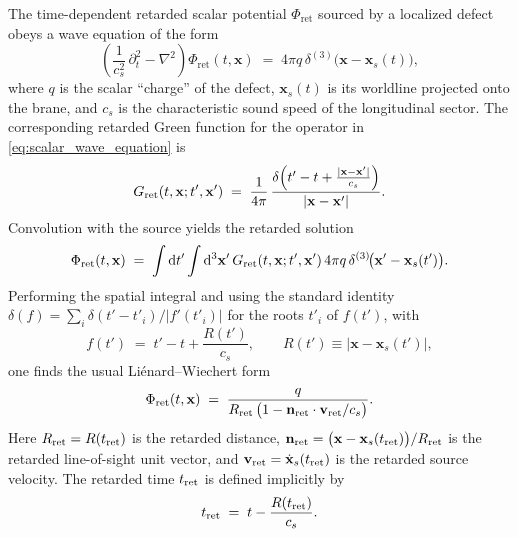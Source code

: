 \documentclass[11pt]{article}
\newcommand{\cS}{c_s}
\begin{document}
The time-dependent retarded scalar potential $\Phi_{\mathrm{ret}}$ sourced by a localized defect
obeys a wave equation of the form
\begin{equation}
  \left( \frac{1}{\cS^2}\,\partial_t^2 - \nabla^2 \right) \Phi_{\mathrm{ret}}(t,\mathbf{x})
  \;=\; 4\pi q\,\delta^{(3)}\!\bigl(\mathbf{x}-\mathbf{x}_s(t)\bigr),
  \label{eq:scalar_wave_equation}
\end{equation}
where $q$ is the scalar ``charge'' of the defect, $\mathbf{x}_s(t)$ is its
worldline projected onto the brane, and $\cS$ is the characteristic sound
speed of the longitudinal sector.  The corresponding retarded Green function
for the operator in \eqref{eq:scalar_wave_equation} is
\begin{equation}
  G_{\rm ret}(t,\mathbf{x};t',\mathbf{x}')
  \;=\;
  \frac{1}{4\pi}\,
  \frac{\delta\!\left(t' - t + \frac{|\mathbf{x}-\mathbf{x}'|}{\cS}\right)}
       {|\mathbf{x}-\mathbf{x}'|}.
  \label{eq:scalar_green_function}
\end{equation}
Convolution with the source yields the retarded solution
\begin{equation}
  \Phi_{\mathrm{ret}}(t,\mathbf{x})
  \;=\;
  \int \mathrm{d}t'\int\mathrm{d}^3\mathbf{x}'\,
  G_{\rm ret}(t,\mathbf{x};t',\mathbf{x}')
  \,4\pi q\,\delta^{(3)}\!\bigl(\mathbf{x}' - \mathbf{x}_s(t')\bigr).
\end{equation}
Performing the spatial integral and using the standard identity
$\delta(f) = \sum_i \delta(t'-t'_i)/|f'(t'_i)|$ for the roots $t'_i$ of
$f(t')$, with
\begin{equation}
  f(t') \;=\; t' - t + \frac{R(t')}{\cS},
  \qquad
  R(t') \equiv \bigl|\mathbf{x}-\mathbf{x}_s(t')\bigr|,
\end{equation}
one finds the usual Liénard--Wiechert form
\begin{equation}
  \Phi_{\mathrm{ret}}(t,\mathbf{x})
  \;=\;
  \frac{q}{R_{\rm ret}\,\bigl(1 - \mathbf{n}_{\rm ret}\cdot\mathbf{v}_{\rm ret}/\cS\bigr)}.
  \label{eq:scalar_lw_general}
\end{equation}
Here $R_{\rm ret} = R(t_{\rm ret})$ is the retarded distance,
$\mathbf{n}_{\rm ret} = \bigl(\mathbf{x}-\mathbf{x}_s(t_{\rm ret})\bigr)
/R_{\rm ret}$ is the retarded line-of-sight unit vector, and
$\mathbf{v}_{\rm ret} = \dot{\mathbf{x}}_s(t_{\rm ret})$ is the retarded
source velocity.  The retarded time $t_{\rm ret}$ is defined implicitly by
\begin{equation}
  t_{\rm ret}
  \;=\;
  t - \frac{R(t_{\rm ret})}{\cS}.
  \label{eq:retarded_time_condition}
\end{equation}
\end{document}
